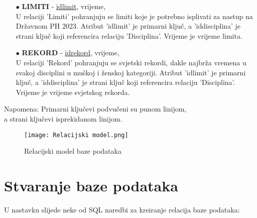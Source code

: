 \documentclass[times, utf8, zavrsni]{fer}
\begin{document}
\begin{itemize}
    \item[$\bullet$] \textbf{LIMITI} - \underline{idlimit}, vrijeme,  \\
    U relaciji 'Limiti' pohranjuju se limiti koje je potrebno isplivati za nastup na Državnom PH 2023. Atribut 'idlimit' je primarni ključ, a 'iddisciplina' 
    je strani ključ koji referencira relaciju 'Disciplina'. Vrijeme je vrijeme limita. 

\vspace{\baselineskip}

    \item[$\bullet$] \textbf{REKORD} - \underline{idrekord}, vrijeme,  \\
    U relaciji 'Rekord' pohranjuju se svjetski rekordi, dakle najbrža vremena u svakoj disciplini u muškoj i ženskoj kategoriji. Atribut 'idlimit' je primarni ključ, 
    a 'iddisciplina' je strani ključ koji referencira relaciju 'Disciplina'. Vrijeme je vrijeme svjetskog rekorda. 
    
\end{itemize}

Napomena: Primarni ključevi podvučeni su punom linijom, \\
\indent a strani ključevi isprekidanom linijom.

\begin{figure}[htb]
    \centering
    \hspace*{-2.5cm}
    \texttt{[image: Relacijski model.png]}
    \centering
    \caption{Relacijski model baze podataka}
    \label{fig:relacijski model}
\end{figure}

\section{Stvaranje baze podataka}
U nastavku slijede neke od SQL naredbi za kreiranje relacija baze podataka:
\end{document}

